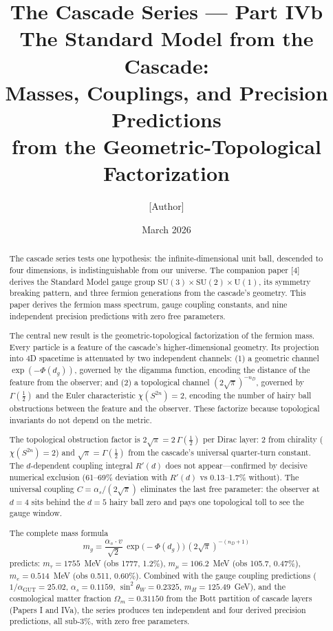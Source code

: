 \documentclass[12pt,a4paper]{article}
\title{\textbf{The Cascade Series --- Part IVb}\\[6pt]
The Standard Model from the Cascade:\\
Masses, Couplings, and Precision Predictions\\
from the Geometric-Topological Factorization}
\author{[Author]}
\date{March 2026}
\begin{document}
\maketitle

\begin{abstract}
The cascade series tests one hypothesis: the infinite-dimensional unit ball, descended to four dimensions, is indistinguishable from our universe. The companion paper [4] derives the Standard Model gauge group $\text{SU}(3) \times \text{SU}(2) \times \text{U}(1)$, its symmetry breaking pattern, and three fermion generations from the cascade's geometry. This paper derives the fermion mass spectrum, gauge coupling constants, and nine independent precision predictions with zero free parameters.

The central new result is the geometric-topological factorization of the fermion mass. Every particle is a feature of the cascade's higher-dimensional geometry. Its projection into 4D spacetime is attenuated by two independent channels: (1) a geometric channel $\exp(-\Phi(d_g))$, governed by the digamma function, encoding the distance of the feature from the observer; and (2) a topological channel $(2\sqrt{\pi})^{-n_D}$, governed by $\Gamma(\tfrac{1}{2})$ and the Euler characteristic $\chi(S^{2n}) = 2$, encoding the number of hairy ball obstructions between the feature and the observer. These factorize because topological invariants do not depend on the metric.

The topological obstruction factor is $2\sqrt{\pi} = 2\,\Gamma(\tfrac{1}{2})$ per Dirac layer: 2 from chirality ($\chi(S^{2n}) = 2$) and $\sqrt{\pi} = \Gamma(\tfrac{1}{2})$ from the cascade's universal quarter-turn constant. The $d$-dependent coupling integral $R'(d)$ does not appear---confirmed by decisive numerical exclusion (61--69\% deviation with $R'(d)$ vs 0.13--1.7\% without). The universal coupling $C = \alpha_s/(2\sqrt{\pi})$ eliminates the last free parameter: the observer at $d = 4$ sits behind the $d = 5$ hairy ball zero and pays one topological toll to see the gauge window.

The complete mass formula
\[
m_g = \frac{\alpha_s \cdot v}{\sqrt{2}}\,\exp\!\bigl(-\Phi(d_g)\bigr)\,(2\sqrt{\pi})^{-(n_D+1)}
\]
predicts: $m_\tau = 1755$~MeV (obs 1777, 1.2\%), $m_\mu = 106.2$~MeV (obs 105.7, 0.47\%), $m_e = 0.514$~MeV (obs 0.511, 0.60\%). Combined with the gauge coupling predictions ($1/\alpha_{\text{GUT}} = 25.02$, $\alpha_s = 0.1159$, $\sin^2\theta_W = 0.2325$, $m_H = 125.49$~GeV), and the cosmological matter fraction $\Omega_m = 0.31150$ from the Bott partition of cascade layers (Papers I and IVa), the series produces ten independent and four derived precision predictions, all sub-3\%, with zero free parameters.


\end{abstract}
\end{document}
